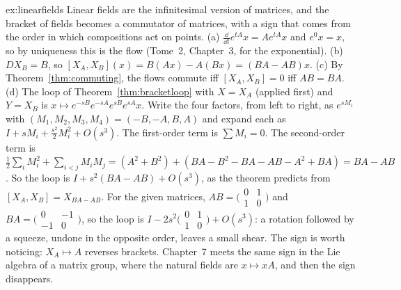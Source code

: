 \begin{solution}{ex:linearfields}
\idea Linear fields are the infinitesimal version of matrices, and the bracket of fields becomes a commutator of matrices, with a sign that comes from the
order in which compositions act on points.
\writeup (a) $\frac{\dd}{\dd t}e^{tA}x=Ae^{tA}x$ and $e^{0}x=x$, so by uniqueness this is the flow (Tome~2, Chapter~3, for the exponential). (b) $DX_B=B$, so
$[X_A,X_B](x)=B(Ax)-A(Bx)=(BA-AB)x$. (c) By Theorem~\ref{thm:commuting}, the flows commute iff $[X_A,X_B]=0$ iff $AB=BA$. (d) The loop of Theorem~\ref{thm:bracketloop} with $X=X_A$ (applied first) and $Y=X_B$ is $x\mapsto e^{-sB}e^{-sA}e^{sB}e^{sA}x$. Write the four
factors, from left to right, as $e^{sM_i}$ with $(M_1,M_2,M_3,M_4)=(-B,-A,B,A)$ and expand each as $I+sM_i+\frac{s^2}2M_i^2+O(s^3)$. The first-order term
is $\sum M_i=0$. The second-order term is $\frac12\sum_iM_i^2+\sum_{i<j}M_iM_j=(A^2+B^2)+(BA-B^2-BA-AB-A^2+BA)=BA-AB$. So the loop is
$I+s^2(BA-AB)+O(s^3)$, as the theorem predicts from $[X_A,X_B]=X_{BA-AB}$. For the given matrices, $AB=\bigl(\begin{smallmatrix}0&1\\1&0\end{smallmatrix}\bigr)$ and
$BA=\bigl(\begin{smallmatrix}0&-1\\-1&0\end{smallmatrix}\bigr)$, so the loop is $I-2s^2\bigl(\begin{smallmatrix}0&1\\1&0\end{smallmatrix}\bigr)+O(s^3)$: a rotation followed by a squeeze,
undone in the opposite order, leaves a small shear. The sign is worth noticing: $X_A\mapsto A$ reverses brackets. Chapter~7 meets the same sign in the
Lie algebra of a matrix group, where the natural fields are $x\mapsto xA$, and then the sign disappears.
\end{solution}

